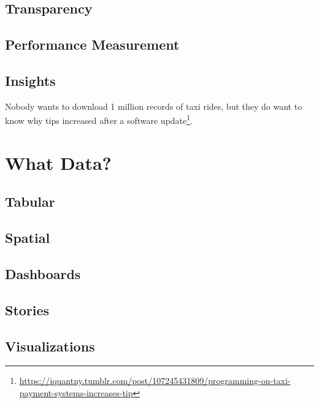\documentclass[
]{book}
\begin{document}
\hypertarget{transparency}{%
\section{Transparency}\label{transparency}}

\hypertarget{performance-measurement}{%
\section{Performance Measurement}\label{performance-measurement}}

\hypertarget{insights}{%
\section{Insights}\label{insights}}

Nobody wants to download 1 million records of taxi rides, but they do want to know why tips increased after a software update\footnote{\url{https://iquantny.tumblr.com/post/107245431809/programming-on-taxi-payment-systems-increases-tip}}.

\hypertarget{what-data}{%
\chapter{What Data?}\label{what-data}}

\hypertarget{tabular}{%
\section{Tabular}\label{tabular}}

\hypertarget{spatial}{%
\section{Spatial}\label{spatial}}

\hypertarget{dashboards}{%
\section{Dashboards}\label{dashboards}}

\hypertarget{stories}{%
\section{Stories}\label{stories}}

\hypertarget{visualizations}{%
\section{Visualizations}\label{visualizations}}
\end{document}
